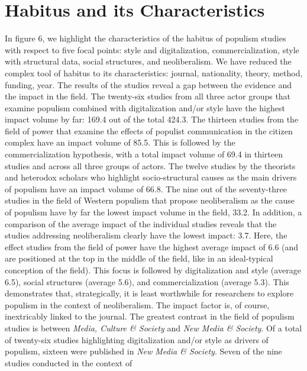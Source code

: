\documentclass{tufte-handout}
\begin{document}
{{\hypertarget{habitus-and-its-characteristics}{%
\section{Habitus and its
Characteristics}\label{habitus-and-its-characteristics}}

In figure 6, we highlight the characteristics of the habitus of populism
studies with respect to five focal points: style and digitalization,
commercialization, style with structural data, social structures, and
neoliberalism. We have reduced the complex tool of habitus to its
characteristics: journal, nationality, theory, method, funding, year.
The results of the studies reveal a gap between the evidence and the
impact in the field. The twenty-six studies from all three actor groups
that examine populism combined with digitalization and/or style have the
highest impact volume by far: 169.4 out of the total 424.3. The thirteen
studies from the field of power that examine the effects of populist
communication in the citizen complex have an impact volume of 85.5. This
is followed by the commercialization hypothesis, with a total impact
volume of 69.4 in thirteen studies and across all three groups of
actors. The twelve studies by the theorists and heterodox scholars who
highlight socio-structural causes as the main drivers of populism have
an impact volume of 66.8. The nine out of the seventy-three studies in
the field of Western populism that propose neoliberalism as the cause of
populism have by far the lowest impact volume in the field, 33.2. In
addition, a comparison of the average impact of the individual studies
reveals that the studies addressing neoliberalism clearly have the
lowest impact: 3.7. Here, the effect studies from the field of power
have the highest average impact of 6.6 (and are positioned at the top in
the middle of the field, like in an ideal-typical conception of the
field). This focus is followed by digitalization and style (average
6.5), social structures (average 5.6), and commercialization (average
5.3). This demonstrates that, strategically, it is least worthwhile for
researchers to explore populism in the context of neoliberalism. The
impact factor is, of course, inextricably linked to the journal. The
greatest contrast in the field of populism studies is between
\emph{Media, Culture \& Society} and \emph{New Media \& Society}. Of a
total of twenty-six studies highlighting digitalization and/or style as
drivers of populism, sixteen were published in \emph{New Media \&
Society}. Seven of the nine studies conducted in the context of
}}
\end{document}
